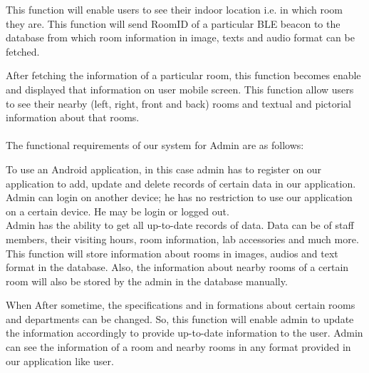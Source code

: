 \documentclass{article}
\begin{document}
This function will enable users to see their indoor location i.e. in which room they are.
This function will send RoomID of a particular BLE beacon to the database from which room information in image, texts and audio format can be fetched.

After fetching the information of a particular room, this function becomes enable and displayed that information on user mobile screen.
This function allow users to see their nearby (left, right, front and back) rooms and textual and pictorial information about that rooms.
\\\\ The functional requirements of our system for Admin are as follows:

To use an Android application, in this case admin has to register on our application to add, update and delete records of certain data in our application.
Admin can login on another device; he has no restriction to use our application on a certain device. He may be login or logged out.
\\
Admin has the ability to get all up-to-date records of data. Data can be of staff members, their visiting hours, room information, lab accessories and much more.
This function will store information about rooms in images, audios and text format in the database. Also, the information about nearby rooms of a certain room will also be stored by the admin in the database manually.

When After sometime, the specifications and in formations about certain rooms and departments can be changed. So, this function will enable admin to update the information accordingly to provide up-to-date information to the user.
Admin can see the information of a room and nearby rooms in any format provided in our application like user.
\end{document}
